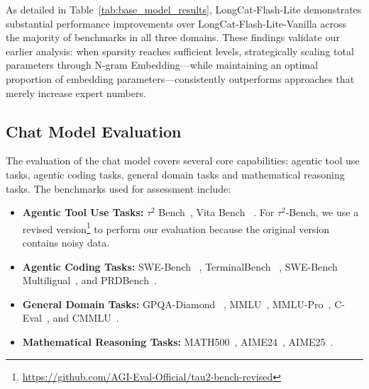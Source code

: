 \documentclass{article}
\newcommand{\longcat}{LongCat-Flash-Lite\xspace}
\newcommand{\method}{N-gram Embedding}
\begin{document}
As detailed in Table~\ref{tab:base_model_results}, \longcat demonstrates substantial performance improvements over \longcat-Vanilla across the majority of benchmarks in all three domains. These findings validate our earlier analysis: when sparsity reaches sufficient levels, strategically scaling total parameters through \method —while maintaining an optimal proportion of embedding parameters—consistently outperforms approaches that merely increase expert numbers.



\subsection{Chat Model Evaluation} 
The evaluation of the chat model covers several core capabilities: agentic tool use tasks, agentic coding tasks, general domain tasks and mathematical reasoning tasks. The benchmarks used for assessment include:
\begin{itemize}
    \item \textbf{Agentic Tool Use Tasks:} $\tau^2$ Bench~\citep{tau2-bench}, Vita Bench ~\citep{he2025vitabench}. For $\tau^2$-Bench, we use a revised version\footnote{\url{https://github.com/AGI-Eval-Official/tau2-bench-revised}} to perform our evaluation because the original version contains noisy data.
    \item \textbf{Agentic Coding Tasks:} SWE-Bench ~\citep{jimenez2023swe}, 
    TerminalBench ~\citep{merrill2026terminalbenchbenchmarkingagentshard}, SWE-Bench Multiligual~\citep{yang2025swesmith}, and PRDBench~\citep{fu2025automatically}. 
    \item \textbf{General Domain Tasks:} GPQA-Diamond ~\citep{rein2024gpqa}, MMLU~\citep{hendrycks2021measuringmassivemultitasklanguage}, MMLU-Pro~\citep{wang2024mmluprorobustchallengingmultitask}, C-Eval~\citep{huang2023ceval}, and CMMLU~\citep{li2023cmmlu}.
    \item \textbf{Mathematical Reasoning Tasks:} MATH500~\citep{math500}, AIME24~\citep{AIME24}, AIME25~\citep{AIME25}.
\end{itemize}
\end{document}
